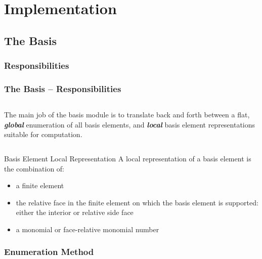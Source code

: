 \documentclass[compress]{beamer}
\begin{document}
\section{Implementation}

\subsection{The Basis}

\subsubsection{Responsibilities}

\begin{frame}
  \frametitle{The Basis -- Responsibilities}
  \begin{columns}
    The main job of the basis module is to translate back and forth between a flat, \emph{\textbf{global}} enumeration
    of all basis elements, and \emph{\textbf{local}} basis element representations suitable for computation.
  \end{columns}
  \pause
  \begin{block}{Basis Element Local Representation}
    A local representation of a basis element is the combination of:
    \begin{itemize}[<+->]
      \item a finite element
      \item the relative face in the finite element on which the basis element is supported: either the interior or relative side face
      \item a monomial or face-relative monomial number
    \end{itemize}
  \end{block}
\end{frame}

\subsubsection{Enumeration Method}
\end{document}
